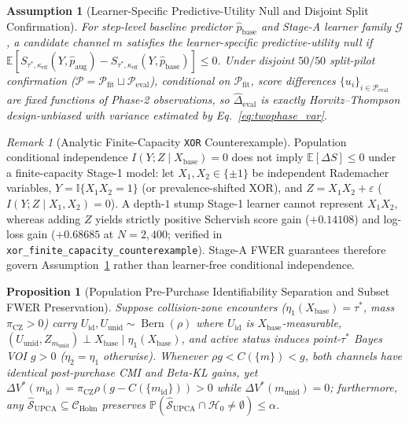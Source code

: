 \documentclass[11pt]{article}
\newtheorem{proposition}{Proposition}
\newtheorem{assumption}{Assumption}
\theoremstyle{remark}
\newtheorem{remark}{Remark}
\begin{document}
\begin{assumption}[Learner-Specific Predictive-Utility Null and Disjoint Split Confirmation]
\label{assump:learner_null}
For step-level baseline predictor $\hat{p}_{\text{base}}$ and Stage-A learner family $\mathcal{G}$, a candidate channel $m$ satisfies the \emph{learner-specific predictive-utility null} if $\mathbb{E}[S_{\tau^*,\kappa_{\text{eff}}}(Y, \hat{p}_{\text{aug}}) - S_{\tau^*,\kappa_{\text{eff}}}(Y, \hat{p}_{\text{base}})] \le 0$. Under disjoint $50/50$ split-pilot confirmation ($\mathcal{P} = \mathcal{P}_{\text{fit}} \sqcup \mathcal{P}_{\text{eval}}$), conditional on $\mathcal{P}_{\text{fit}}$, score differences $\{u_i\}_{i \in \mathcal{P}_{\text{eval}}}$ are fixed functions of Phase-2 observations, so $\hat{\Delta}_{\text{eval}}$ is exactly Horvitz--Thompson design-unbiased with variance estimated by Eq.~\eqref{eq:twophase_var}.
\end{assumption}

\begin{remark}[Analytic Finite-Capacity \texttt{XOR} Counterexample]
\label{rem:xor_null}
Population conditional independence $I(Y; Z \mid X_{\text{base}}) = 0$ does not imply $\mathbb{E}[\Delta S] \le 0$ under a finite-capacity Stage-1 model: let $X_1, X_2 \in \{\pm 1\}$ be independent Rademacher variables, $Y = \mathbb{I}\{X_1 X_2 = 1\}$ (or prevalence-shifted XOR), and $Z = X_1 X_2 + \varepsilon$ ($I(Y;Z\mid X_1,X_2)=0$). A depth-$1$ stump Stage-1 learner cannot represent $X_1 X_2$, whereas adding $Z$ yields strictly positive Schervish score gain ($+0.14108$) and log-loss gain ($+0.68685$ at $N=2{,}400$; verified in \texttt{xor\_\allowbreak finite\_\allowbreak capacity\_\allowbreak counterexample}). Stage-A FWER guarantees therefore govern Assumption~\ref{assump:learner_null} rather than learner-free conditional independence.
\end{remark}

\begin{proposition}[Population Pre-Purchase Identifiability Separation and Subset FWER Preservation]
\label{prop:prepurchase}
Suppose collision-zone encounters ($\eta_1(X_{\text{base}})=\tau^*$, mass $\pi_{\text{CZ}}>0$) carry $U_{\text{id}}, U_{\text{unid}} \sim \operatorname{Bern}(\rho)$ where $U_{\text{id}}$ is $X_{\text{base}}$-measurable, $(U_{\text{unid}}, Z_{m_{\text{unid}}}) \perp X_{\text{base}} \mid \eta_1(X_{\text{base}})$, and active status induces point-$\tau^*$ Bayes VOI $g > 0$ ($\eta_2=\eta_1$ otherwise). Whenever $\rho g < C(\{m\}) < g$, both channels have identical post-purchase CMI and Beta-KL gains, yet $\Delta V^*(m_{\text{id}}) = \pi_{\text{CZ}}\rho(g - C(\{m_{\text{id}}\})) > 0$ while $\Delta V^*(m_{\text{unid}}) = 0$; furthermore, any $\hat{\mathcal{S}}_{\text{UPCA}} \subseteq \mathcal{C}_{\text{Holm}}$ preserves $\mathbb{P}(\hat{\mathcal{S}}_{\text{UPCA}} \cap \mathcal{H}_0 \ne \emptyset) \le \alpha$.
\end{proposition}
\end{document}
